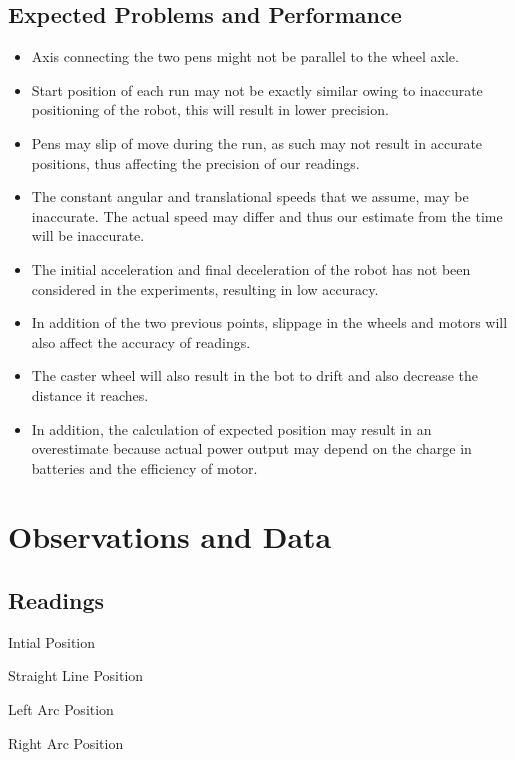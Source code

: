 \documentclass[10pt,a4paper]{article}
\begin{document}
			\subsection{Expected Problems and Performance}
				\begin{itemize}
					\item Axis connecting the two pens might not be parallel to the wheel axle.
					\item Start position of each run may not be exactly similar owing to inaccurate positioning of the robot, this will result in lower precision.
					\item Pens may slip of move during the run, as such may not result in accurate positions, thus affecting the precision of our readings.
					\item The constant angular and translational speeds that we assume, may be inaccurate. The actual speed may differ and thus our estimate from the time will be inaccurate.
					\item The initial acceleration and final deceleration of the robot has not been considered in the experiments, resulting in low accuracy.
					\item In addition of the two previous points, slippage in the wheels and motors will also affect the accuracy of readings.
					\item The caster wheel will also result in the bot to drift and also decrease the distance it reaches.
					\item In addition, the calculation of expected position may result in an overestimate because actual power output may depend on the charge in batteries and the efficiency of motor.
				\end{itemize}
			\section{Observations and Data}
				\subsection{Readings}
					\begin{table}[H]
						\centering
						
						\caption{Intial Position}
					\end{table}
					\begin{table}[H]
						\centering
						
						\caption{Straight Line Position}
					\end{table}
					\begin{table}[H]
						\centering
						
						\caption{Left Arc Position}
					\end{table}
					\begin{table}[H]
						\centering
						
						\caption{Right Arc Position}
					\end{table}
\end{document}
